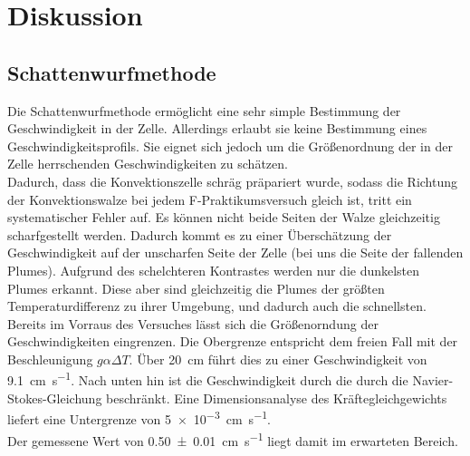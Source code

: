 \section{Diskussion}
\subsection{Schattenwurfmethode}
Die Schattenwurfmethode ermöglicht eine sehr simple Bestimmung der Geschwindigkeit in der Zelle. Allerdings erlaubt sie keine Bestimmung eines Geschwindigkeitsprofils. 
Sie eignet sich jedoch um die Größenordnung der in der Zelle herrschenden Geschwindigkeiten zu schätzen.
\\
Dadurch, dass die Konvektionszelle schräg präpariert wurde, sodass die Richtung der Konvektionswalze bei jedem F-Praktikumsversuch gleich ist, tritt ein systematischer Fehler auf.
Es können nicht beide Seiten der Walze gleichzeitig scharfgestellt werden.
Dadurch kommt es zu einer Überschätzung der Geschwindigkeit auf der unscharfen Seite der Zelle (bei uns die Seite der fallenden Plumes). 
Aufgrund des schelchteren Kontrastes werden nur die dunkelsten Plumes erkannt. Diese aber sind gleichzeitig die Plumes der größten Temperaturdifferenz zu ihrer Umgebung, und dadurch auch die schnellsten.
\\
Bereits im Vorraus des Versuches lässt sich die Größenorndung der Geschwindigkeiten eingrenzen. Die Obergrenze entspricht dem freien Fall mit der Beschleunigung $g\alpha\Delta T$. Über \SI{20}{\centi\meter} führt dies zu einer Geschwindigkeit von \SI{9.1}{\centi\meter\per\second}. Nach unten hin ist die Geschwindigkeit durch die durch die Navier-Stokes-Gleichung beschränkt. Eine Dimensionsanalyse des Kräftegleichgewichts liefert eine Untergrenze von \SI{5e-3}{\centi\meter\per\second}.
\\
Der gemessene Wert von \SI{0.50\pm0.01}{\centi\meter\per\second} liegt damit im erwarteten Bereich.


